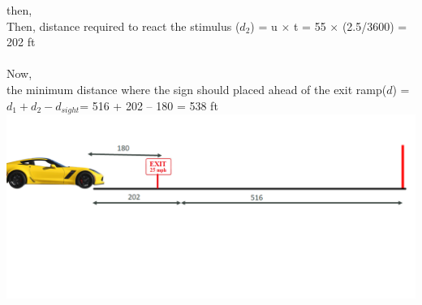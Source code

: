 then,\\
Then,
distance required to react the stimulus ($ d_2 $) = u $ \times $ t = 55 $ \times $ (2.5/3600) = 202 ft\\\\
Now,\\
the minimum distance where the sign should placed ahead of the exit ramp($ d $) = $ d_1 + d_2 - d_{sight} $= 516 + 202 – 180 = 538 ft\\
\includegraphics[scale=0.3]{gfx/visualAquityNum.png}




